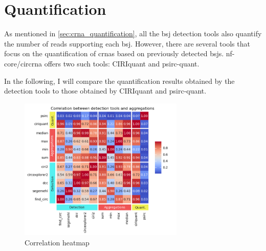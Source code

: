 \section{Quantification}

As mentioned in \cref{sec:crna_quantification}, all the \gls{bsj} detection
tools also quantify the number of reads supporting each \gls{bsj}.
However, there are several tools that focus on the quantification of
\gls{crna}s based on previously detected \gls{bsj}s.
nf-core/circrna offers two such tools:
CIRIquant
and psirc-quant.

In the following, I will compare the quantification results obtained by
the detection tools to those obtained by CIRIquant and psirc-quant.

\begin{figure}[ht]
    \centering

    \includegraphics[width=0.7\textwidth]{chapters/4_results_and_discussion/figures/quantification/correlation_heatmap.png}
    \caption{Correlation heatmap
    }
    \label{fig:quantification_correlation_heatmap}
\end{figure}